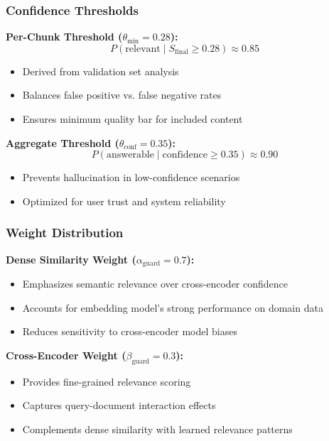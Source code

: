 \documentclass[11pt,a4paper]{article}
\begin{document}
\subsubsection{Confidence Thresholds}

\textbf{Per-Chunk Threshold ($\theta_{\text{min}} = 0.28$):}
\begin{equation}
P(\text{relevant} \mid S_{\text{final}} \geq 0.28) \approx 0.85
\end{equation}

\begin{itemize}
    \item Derived from validation set analysis
    \item Balances false positive vs. false negative rates
    \item Ensures minimum quality bar for included content
\end{itemize}

\textbf{Aggregate Threshold ($\theta_{\text{conf}} = 0.35$):}
\begin{equation}
P(\text{answerable} \mid \text{confidence} \geq 0.35) \approx 0.90
\end{equation}

\begin{itemize}
    \item Prevents hallucination in low-confidence scenarios
    \item Optimized for user trust and system reliability
\end{itemize}

\subsubsection{Weight Distribution}

\textbf{Dense Similarity Weight ($\alpha_{\text{guard}} = 0.7$):}
\begin{itemize}
    \item Emphasizes semantic relevance over cross-encoder confidence
    \item Accounts for embedding model's strong performance on domain data
    \item Reduces sensitivity to cross-encoder model biases
\end{itemize}

\textbf{Cross-Encoder Weight ($\beta_{\text{guard}} = 0.3$):}
\begin{itemize}
    \item Provides fine-grained relevance scoring
    \item Captures query-document interaction effects
    \item Complements dense similarity with learned relevance patterns
\end{itemize}
\end{document}
